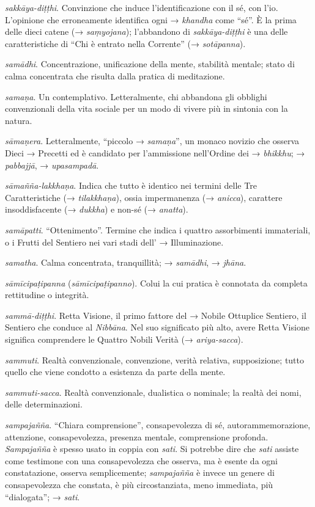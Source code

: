 \emph{sakkāya-diṭṭhi}. Convinzione che induce l'identificazione con il
sé, con l'io. L'opinione che erroneamente identifica ogni →
\emph{khandha} come ``sé''. È la prima delle dieci catene (→
\emph{saṃyojana}); l'abbandono di \emph{sakkāya-diṭṭhi} è una delle
caratteristiche di ``Chi è entrato nella Corrente'' (→
\emph{sotāpanna}).

\emph{samādhi}. Concentrazione, unificazione della mente, stabilità
mentale; stato di calma concentrata che risulta dalla pratica di
meditazione.

\emph{samaṇa}. Un contemplativo. Letteralmente, chi abbandona gli
obblighi convenzionali della vita sociale per un modo di vivere più in
sintonia con la natura.

\emph{sāmaṇera}. Letteralmente, ``piccolo → \emph{samaṇa}'', un monaco
novizio che osserva Dieci → Precetti ed è candidato per l'ammissione
nell'Ordine dei → \emph{bhikkhu}; → \emph{pabbajjā}, →
\emph{upasampadā}.

\emph{sāmañña-lakkhaṇa}. Indica che tutto è identico nei termini delle
Tre Caratteristiche (→ \emph{tilakkhaṇa}), ossia impermanenza (→
\emph{anicca}), carattere insoddisfacente (→ \emph{dukkha}) e non-sé (→
\emph{anatta}).

\emph{samāpatti}. ``Ottenimento''. Termine che indica i quattro
assorbimenti immateriali, o i Frutti del Sentiero nei vari stadi dell' →
Illuminazione.

\emph{samatha}. Calma concentrata, tranquillità; → \emph{samādhi}, →
\emph{jhāna}.

\emph{sāmīcipaṭipanna} (\emph{sāmīcipaṭipanno}). Colui la cui pratica è
connotata da completa rettitudine o integrità.

\emph{sammā-diṭṭhi}. Retta Visione, il primo fattore del → Nobile
Ottuplice Sentiero, il Sentiero che conduce al \emph{Nibbāna}. Nel suo
significato più alto, avere Retta Visione significa comprendere le
Quattro Nobili Verità (→ \emph{ariya-sacca}).

\emph{sammuti}. Realtà convenzionale, convenzione, verità relativa,
supposizione; tutto quello che viene condotto a esistenza da parte della
mente.

\emph{sammuti-sacca}. Realtà convenzionale, dualistica o nominale; la
realtà dei nomi, delle determinazioni.

\emph{sampajañña}. ``Chiara comprensione'', consapevolezza di sé,
autorammemorazione, attenzione, consapevolezza, presenza mentale,
comprensione profonda. \emph{Sampajañña} è spesso usato in coppia con
\emph{sati}. Si potrebbe dire che \emph{sati} assiste come testimone con
una consapevolezza che osserva, ma è esente da ogni constatazione,
osserva semplicemente; \emph{sampajañña} è invece un genere di
consapevolezza che constata, è più circostanziata, meno immediata, più
``dialogata''; → \emph{sati}.

